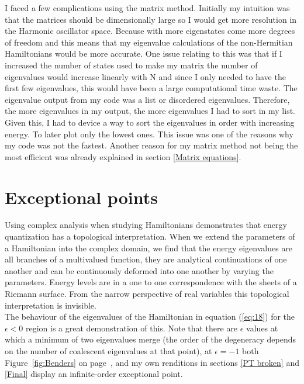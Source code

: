 \documentclass[10pt, a4paper, singlespacing]{report}
\begin{document}
I faced a few complications using the matrix method. Initially my intuition was that the matrices should be dimensionally large so I would get more resolution in the Harmonic oscillator space. Because with more eigenstates come more degrees of freedom and this means that my eigenvalue calculations of the non-Hermitian Hamiltonians would be more accurate. One issue relating to this was that if I increased the number of states used to make my matrix the number of eigenvalues would increase linearly with N and since I only needed to have the first few eigenvalues, this would have been a large computational time waste. The eigenvalue output from my code was a list or disordered eigenvalues. Therefore, the more eigenvalues in my output, the more eigenvalues I had to sort in my list. Given this, I had to device a way to sort the eigenvalues in order with increasing energy. To later plot only the lowest ones. This issue was one of the reasons why my code was not the fastest. Another reason for my matrix method not being the most efficient was already explained in section \ref{Matrix equations}.

\section{Exceptional points}\label{EPs}

Using complex analysis when studying Hamiltonians demonstrates that energy quantization has a topological interpretation. When we extend the parameters of a Hamiltonian into the complex domain, we find that the energy eigenvalues are all branches of a multivalued function, they are analytical continuations of one another and can be continuously deformed into one another by varying the parameters. Energy levels are in a one to one correspondence with the sheets of a Riemann surface. From the narrow perspective of real variables this topological interpretation is invisible\cite{BenderPT}.\\The behaviour of the eigenvalues of the Hamiltonian in equation (\ref{eq:18}) for the $\epsilon < 0$ region is a great demonstration of this. Note that there are $\epsilon$ values at which a minimum of two eigenvalues merge (the order of the degeneracy depends on the number of coalescent eigenvalues at that point\cite{BenderPT}\cite{Bender2017}), at $\epsilon = -1$ both Figure~\ref{fig:Benders} on page~\pageref{fig:Benders}, and my own renditions in sections \ref{PT broken} and \ref{Final} display an infinite-order exceptional point.\\\\
\end{document}
